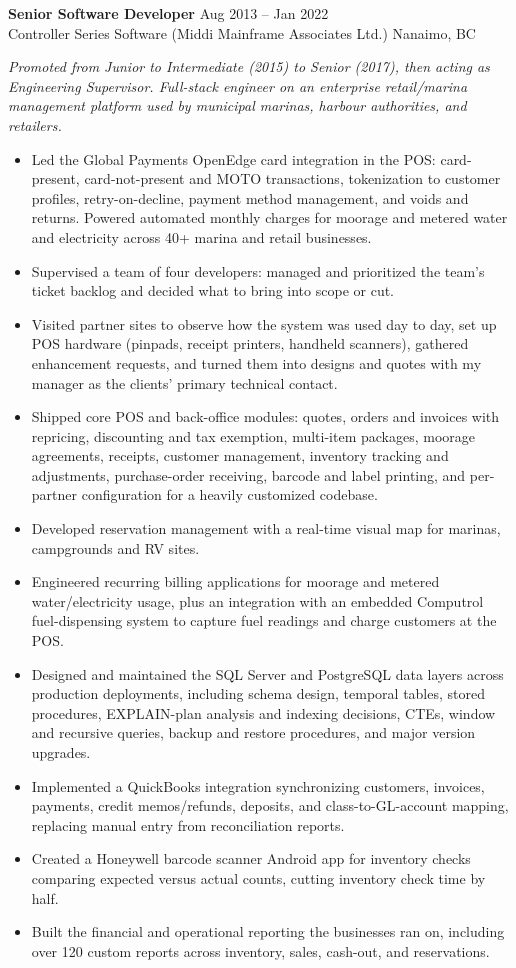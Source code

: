 \documentclass[10.5pt]{article}
\newcommand{\jobheader}[4]{%
  \needspace{6\baselineskip}%
  \vspace{7pt}
  \textbf{#1} \hfill {\color{accentlight}\small #2}\\
  {\small\color{textgray!80} #3} \hfill {\small\color{textgray!80} #4}\\[-2pt]%
}
\begin{document}
\jobheader{Senior Software Developer}{Aug 2013 -- Jan 2022}{Controller Series Software (Middi Mainframe Associates Ltd.)}{Nanaimo, BC}
{\small\color{textgray!80}\textit{Promoted from Junior to Intermediate (2015) to Senior (2017), then acting as Engineering Supervisor. Full-stack engineer on an enterprise retail/marina management platform used by municipal marinas, harbour authorities, and retailers.}\par}
\begin{itemize}
  \item Led the Global Payments OpenEdge card integration in the POS: card-present, card-not-present and MOTO transactions, tokenization to customer profiles, retry-on-decline, payment method management, and voids and returns. Powered automated monthly charges for moorage and metered water and electricity across 40+ marina and retail businesses.
  \item Supervised a team of four developers: managed and prioritized the team's ticket backlog and decided what to bring into scope or cut.
  \item Visited partner sites to observe how the system was used day to day, set up POS hardware (pinpads, receipt printers, handheld scanners), gathered enhancement requests, and turned them into designs and quotes with my manager as the clients' primary technical contact.
  \item Shipped core POS and back-office modules: quotes, orders and invoices with repricing, discounting and tax exemption, multi-item packages, moorage agreements, receipts, customer management, inventory tracking and adjustments, purchase-order receiving, barcode and label printing, and per-partner configuration for a heavily customized codebase.
  \item Developed reservation management with a real-time visual map for marinas, campgrounds and RV sites.
  \item Engineered recurring billing applications for moorage and metered water/electricity usage, plus an integration with an embedded Computrol fuel-dispensing system to capture fuel readings and charge customers at the POS.
  \item Designed and maintained the SQL Server and PostgreSQL data layers across production deployments, including schema design, temporal tables, stored procedures, EXPLAIN-plan analysis and indexing decisions, CTEs, window and recursive queries, backup and restore procedures, and major version upgrades.
  \item Implemented a QuickBooks integration synchronizing customers, invoices, payments, credit memos/refunds, deposits, and class-to-GL-account mapping, replacing manual entry from reconciliation reports.
  \item Created a Honeywell barcode scanner Android app for inventory checks comparing expected versus actual counts, cutting inventory check time by half.
  \item Built the financial and operational reporting the businesses ran on, including over 120 custom reports across inventory, sales, cash-out, and reservations.
\end{itemize}
\end{document}
